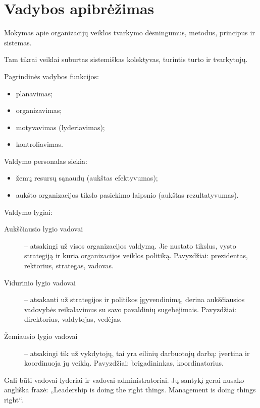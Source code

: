 \chapter{Vadybos apibrėžimas}

\begin{defn}[Vadyba]
  Mokymas apie organizacijų veiklos tvarkymo dėsningumus, metodus,
  principus ir sistemas.
\end{defn}

\begin{defn}[Organizacija]
  Tam tikrai veiklai suburtas sistemiškas kolektyvas, turintis turto ir
  tvarkytojų.
\end{defn}

Pagrindinės vadybos funkcijos:
\begin{itemize}
  \item planavimas;
  \item organizavimas;
  \item motyvavimas (lyderiavimas);
  \item kontroliavimas.
\end{itemize}

Valdymo personalas siekia:
\begin{itemize}
  \item žemų resursų sąnaudų (aukštas efektyvumas);
  \item aukšto organizacijos tikslo pasiekimo laipsnio (aukštas
  rezultatyvumas).
\end{itemize}

Valdymo lygiai:
\begin{description}
  \item[Aukščiausio lygio vadovai] – atsakingi už visos organizacijos
    valdymą. Jie nustato tikslus, vysto strategiją ir kuria organizacijos
    veiklos politiką. Pavyzdžiai: prezidentas, rektorius, strategas,
    vadovas.
  \item[Vidurinio lygio vadovai] – atsakanti už strategijos ir politikos
    įgyvendinimą, derina aukščiausios vadovybės reikalavimus su savo
    pavaldinių sugebėjimais. Pavyzdžiai: direktorius, valdytojas,
    vedėjas.
  \item[Žemiausio lygio vadovai] – atsakingi tik už vykdytojų, tai yra
    eilinių darbuotojų darbą: įvertina ir koordinuoja jų veiklą.
    Pavyzdžiai: brigadininkas, koordinatorius.
\end{description}

Gali būti vadovai-lyderiai ir vadovai-administratoriai. Jų santykį
gerai nusako angliška frazė: „Leadership is doing the right things.
Management is doing things right“.

